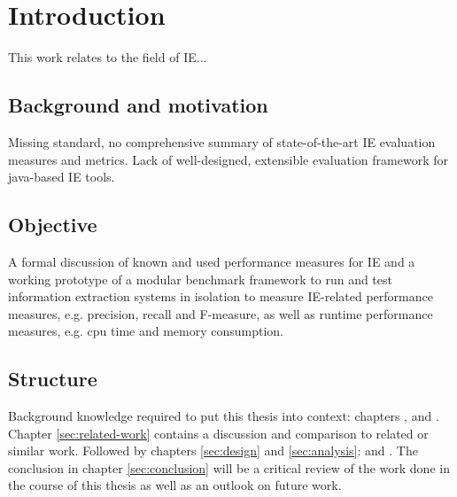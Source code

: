 \section{Introduction}

This work relates to the field of \gls{IE}...

\subsection{Background and motivation}
Missing standard, no comprehensive summary of state-of-the-art IE evaluation measures and metrics. Lack of well-designed, extensible evaluation framework for java-based IE tools.

\subsection{Objective}
A formal discussion of known and used performance measures for IE and a working prototype of a modular benchmark framework to run and test information extraction systems in isolation to measure IE-related performance measures, e.g. precision, recall and F-measure, as well as runtime performance measures, e.g. cpu time and memory consumption.

\subsection{Structure}
Background knowledge required to put this thesis into context: chapters ,  and . Chapter \ref{sec:related-work} contains a discussion and comparison to related or similar work. Followed by chapters \ref{sec:design} and \ref{sec:analysis}:  and . The conclusion in chapter \ref{sec:conclusion} will be a critical review of the work done in the course of this thesis as well as an outlook on future work.